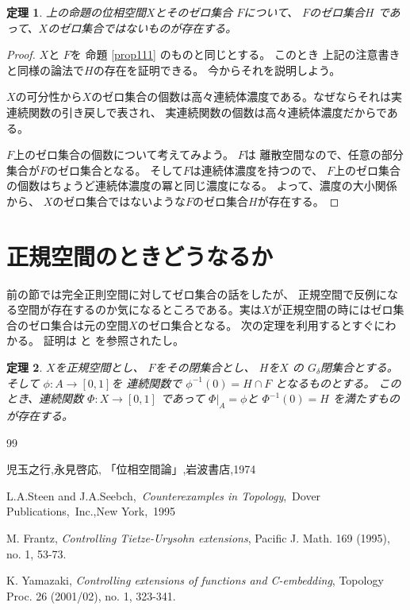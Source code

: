 \documentclass[leqno, a4paper, 12pt]{jsarticle}
\newtheorem{thm}{定理}
\begin{document}
\begin{thm}
上の命題の位相空間$X$とそのゼロ集合
$F$について、
$F$のゼロ集合$H$
であって、$X$のゼロ集合ではないものが存在する。
\end{thm}
\begin{proof}
$X$と
$F$を
命題
\ref{prop111}
のものと同じとする。
このとき
上記の注意書きと同様の論法で$H$の存在を証明できる。
今からそれを説明しよう。

$X$の可分性から$X$のゼロ集合の個数は高々連続体濃度である。なぜならそれは実連続関数の引き戻しで表され、
実連続関数の個数は高々連続体濃度だからである。

$F$上のゼロ集合の個数について考えてみよう。
$F$は
離散空間なので、任意の部分集合が$F$のゼロ集合となる。
そして$F$は連続体濃度を持つので、
$F$上のゼロ集合の個数はちょうど連続体濃度の冪と同じ濃度になる。
よって、濃度の大小関係から、
$X$のゼロ集合ではないような$F$のゼロ集合$H$が存在する。
\end{proof}

\section{正規空間のときどうなるか}

前の節では完全正則空間に対してゼロ集合の話をしたが、
正規空間で反例になる空間が存在するのか気になるところである。実は$X$が正規空間の時にはゼロ集合のゼロ集合は元の空間$X$のゼロ集合となる。
次の定理を利用するとすぐにわかる。
証明は
\cite[Corollary 2.1]{ka}と
\cite[Theorem 1]{fr}
を参照されたし。

\begin{thm}
$X$を正規空間とし、
$F$をその閉集合とし、
$H$を$X$
の
$G_{\delta}$閉集合とする。
そして
$\phi\colon A\to [0, 1]$を
連続関数で
$\phi^{-1}(0)=H\cap F$
となるものとする。
このとき、連続関数
$\Phi\colon X\to [0, 1]$
であって
$\Phi|_{A}=\phi$と
$\Phi^{-1}(0)=H$
を満たすものが存在する。
\end{thm}



\begin{thebibliography}{99}

児玉之行,永見啓応,
「位相空間論」,岩波書店,1974

L.A.Steen and J.A.Seebch,\ {\it Counterexamples in Topology},\ Dover Publications,\ Inc.,New York,\ 1995



M. Frantz, 
\textit{Controlling Tietze-Urysohn extensions}, Pacific J. Math. 169 (1995),
no. 1, 53-73.

 K. Yamazaki, 
\textit{Controlling extensions of functions and C-embedding}, 
Topology
Proc. 26 (2001/02), no. 1, 323-341.

\end{thebibliography}
\end{document}
